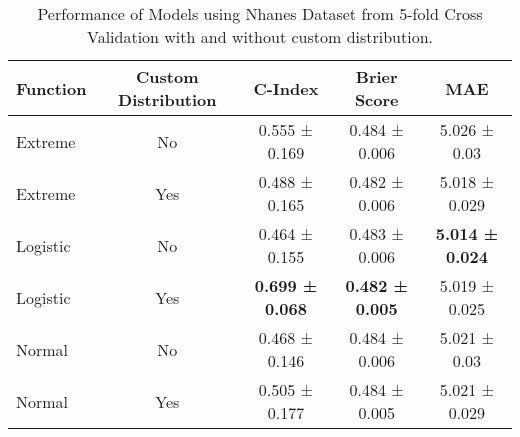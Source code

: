 \begin{table}[h!]
\centering
\caption{Performance of Models using Nhanes Dataset from 5-fold Cross Validation with and without custom distribution.}
\label{tab:model_performance_nhanes_1}
\begin{tabular}{l|c|c|c|c}
\hline
\textbf{Function} & \textbf{Custom Distribution} & \textbf{C-Index} & \textbf{Brier Score} & \textbf{MAE} \\
\hline
Extreme & No & 0.555 ± 0.169 & 0.484 ± 0.006 & 5.026 ± 0.03 \\
Extreme & Yes & 0.488 ± 0.165 & 0.482 ± 0.006 & 5.018 ± 0.029 \\
Logistic & No & 0.464 ± 0.155 & 0.483 ± 0.006 & \textbf{5.014 ± 0.024} \\
Logistic & Yes & \textbf{0.699 ± 0.068} & \textbf{0.482 ± 0.005} & 5.019 ± 0.025 \\
Normal & No & 0.468 ± 0.146 & 0.484 ± 0.006 & 5.021 ± 0.03 \\
Normal & Yes & 0.505 ± 0.177 & 0.484 ± 0.005 & 5.021 ± 0.029 \\
\hline
\end{tabular}
\end{table}
